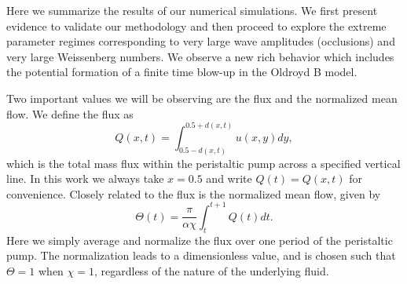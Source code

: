 Here we summarize the results of our numerical simulations. We first present evidence to validate our methodology and then proceed to explore the extreme parameter regimes corresponding to very large wave amplitudes (occlusions) and very large Weissenberg numbers. We observe a new rich behavior which includes the potential formation of a finite time blow-up in the Oldroyd B model.

Two important values we will be observing are the flux and the normalized mean flow. We define the flux as
\begin{equation}
\label{eq:Flux}
Q(x,t) = \int^{0.5+d(x,t)}_{0.5-d(x,t)}u(x,y)dy,
\end{equation}
which is the total mass flux within the peristaltic pump across a specified vertical line. In this work we always take $x=0.5$ and write $Q(t)=Q(x,t)$ for convenience. Closely related to the flux is the normalized mean flow, given by
\begin{equation}
\label{eq:MeanFlow}
\Theta(t) = \frac{\pi}{\alpha\chi}
\int^{t+1}_{t} Q(t) dt.
\end{equation}
Here we simply average and normalize the flux over one period of the peristaltic pump. The normalization leads to a dimensionless value, and is chosen such that $\Theta=1$ when $\chi=1$, regardless of the nature of the underlying fluid.

